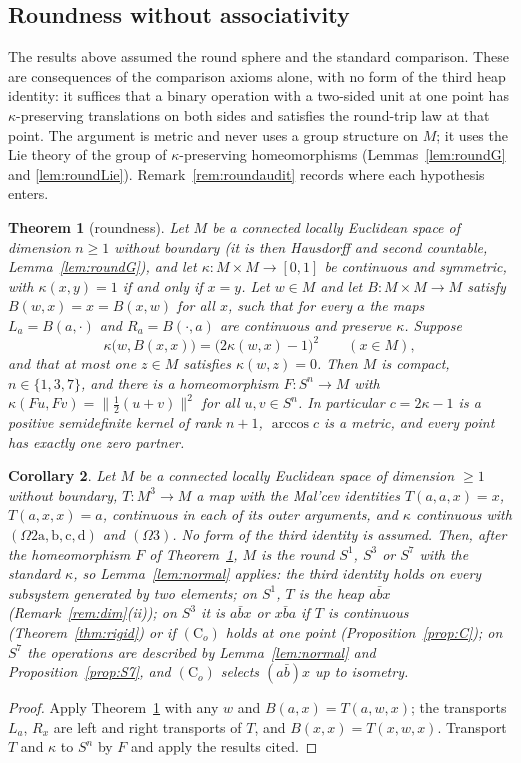 \documentclass[11pt,reqno]{amsart}
\newtheorem{theorem}{Theorem}[section]
\newtheorem{corollary}[theorem]{Corollary}
\theoremstyle{definition}
\theoremstyle{remark}
\numberwithin{equation}{section}
\begin{document}
\subsection{Roundness without associativity}\label{sec:round}
The results above assumed the round sphere and the standard comparison.  These are consequences of the comparison axioms
alone, with no form of the third heap identity: it suffices that a binary operation with a two-sided unit at one point has
$\kappa$-preserving translations on both sides and satisfies the round-trip law at that point.  The argument is metric and
never uses a group structure on $M$; it uses the Lie theory of the group of $\kappa$-preserving homeomorphisms
(Lemmas~\ref{lem:roundG} and \ref{lem:roundLie}).  Remark~\ref{rem:roundaudit} records where each hypothesis enters.

\begin{theorem}[roundness]\label{thm:round}
Let $M$ be a connected locally Euclidean space of dimension $n\ge1$ without boundary (it is then Hausdorff and second countable,
Lemma~\ref{lem:roundG}), and let
$\kappa\colon M\times M\to[0,1]$ be continuous and symmetric, with $\kappa(x,y)=1$ if and only if $x=y$.  Let $w\in M$ and let
$B\colon M\times M\to M$ satisfy $B(w,x)=x=B(x,w)$ for all $x$, such that for every $a$ the maps $L_a=B(a,\cdot)$ and
$R_a=B(\cdot,a)$ are continuous and preserve $\kappa$.  Suppose
\[
\kappa\bigl(w,B(x,x)\bigr)=\bigl(2\kappa(w,x)-1\bigr)^2\qquad(x\in M),
\]
and that at most one $z\in M$ satisfies $\kappa(w,z)=0$.  Then $M$ is compact, $n\in\{1,3,7\}$, and there is a homeomorphism
$F\colon S^n\to M$ with $\kappa(Fu,Fv)=\lVert\tfrac12(u+v)\rVert^2$ for all $u,v\in S^n$.  In particular $c=2\kappa-1$ is a positive
semidefinite kernel of rank $n+1$, $\arccos c$ is a metric, and every point has exactly one zero partner.
\end{theorem}

\begin{corollary}\label{cor:round}
Let $M$ be a connected locally Euclidean space of dimension $\ge1$ without boundary, $T\colon M^3\to M$ a map with the Mal'cev identities
$T(a,a,x)=x$, $T(a,x,x)=a$, continuous in each of its outer arguments, and $\kappa$ continuous with $(\Omega2\mathrm{a,b,c,d})$ and
$(\Omega3)$.  No form of the third identity is assumed.  Then, after the homeomorphism $F$ of Theorem~\ref{thm:round}, $M$ is the
round $S^1$, $S^3$ or $S^7$ with the standard $\kappa$, so Lemma~\ref{lem:normal} applies: the third identity holds on every subsystem
generated by two elements; on $S^1$, $T$ is the heap $a\bar bx$ (Remark~\ref{rem:dim}(ii)); on $S^3$ it is $a\bar bx$ or $x\bar ba$ if $T$ is continuous
(Theorem~\ref{thm:rigid}) or if $(\mathrm C_o)$ holds at one point (Proposition~\ref{prop:C}); on $S^7$ the operations are described by
Lemma~\ref{lem:normal} and Proposition~\ref{prop:S7}, and $(\mathrm C_o)$ selects $(a\bar b)x$ up to isometry.
\end{corollary}
\begin{proof}
Apply Theorem~\ref{thm:round} with any $w$ and $B(a,x)=T(a,w,x)$; the transports $L_a$, $R_x$ are left and right transports of $T$, and
$B(x,x)=T(x,w,x)$.  Transport $T$ and $\kappa$ to $S^n$ by $F$ and apply the results cited.
\end{proof}
\end{document}
